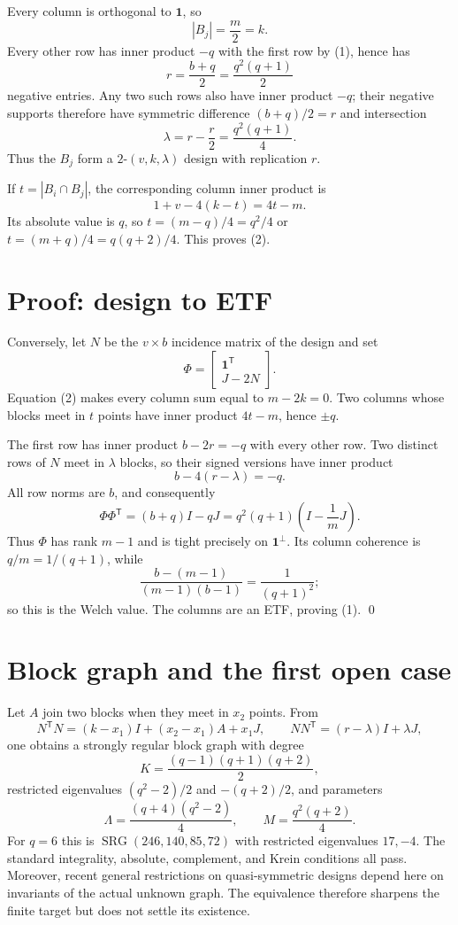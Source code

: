 \documentclass[10pt]{article}
\newcommand{\one}{\mathbf 1}
\begin{document}
Every column is orthogonal to $\one$, so
\[
 |B_j|=\frac m2=k.                                      \tag{2}
\]
Every other row has inner product $-q$ with the first row by (1), hence has
\[
 r=\frac{b+q}{2}=\frac{q^2(q+1)}2                       \tag{3}
\]
negative entries.  Any two such rows also have inner product $-q$; their
negative supports therefore have symmetric difference $(b+q)/2=r$ and
intersection
\[
 \lambda=r-\frac r2=\frac{q^2(q+1)}4.                  \tag{4}
\]
Thus the $B_j$ form a $2$-$(v,k,\lambda)$ design with replication $r$.

If $t=|B_i\cap B_j|$, the corresponding column inner product is
\[
 1+v-4(k-t)=4t-m.
\]
Its absolute value is $q$, so $t=(m-q)/4=q^2/4$ or
$t=(m+q)/4=q(q+2)/4$.  This proves (2).

\section*{Proof: design to ETF}

Conversely, let $N$ be the $v\times b$ incidence matrix of the design and set
\[
 \Phi=\begin{bmatrix}\one^{\mathsf T}\\ J-2N\end{bmatrix}.
\]
Equation (2) makes every column sum equal to $m-2k=0$.  Two columns whose
blocks meet in $t$ points have inner product $4t-m$, hence $\pm q$.

The first row has inner product $b-2r=-q$ with every other row.  Two distinct
rows of $N$ meet in $\lambda$ blocks, so their signed versions have inner
product
\[
 b-4(r-\lambda)=-q.
\]
All row norms are $b$, and consequently
\[
 \Phi\Phi^{\mathsf T}=(b+q)I-qJ
 =q^2(q+1)\left(I-\frac1mJ\right).                     \tag{5}
\]
Thus $\Phi$ has rank $m-1$ and is tight precisely on $\one^\perp$.
Its column coherence is $q/m=1/(q+1)$, while
\[
 \frac{b-(m-1)}{(m-1)(b-1)}=\frac1{(q+1)^2};
\]
so this is the Welch value.  The columns are an ETF, proving (1). \qed

\section*{Block graph and the first open case}

Let $A$ join two blocks when they meet in $x_2$ points.  From
\[
 N^{\mathsf T}N=(k-x_1)I+(x_2-x_1)A+x_1J,
 \qquad NN^{\mathsf T}=(r-\lambda)I+\lambda J,
\]
one obtains a strongly regular block graph with degree
\[
 K=\frac{(q-1)(q+1)(q+2)}2,
\]
restricted eigenvalues $(q^2-2)/2$ and $-(q+2)/2$, and parameters
\[
 \Lambda=\frac{(q+4)(q^2-2)}4,\qquad
 M=\frac{q^2(q+2)}4.
\]
For $q=6$ this is $\operatorname{SRG}(246,140,85,72)$ with restricted
eigenvalues $17,-4$.  The standard integrality, absolute, complement, and
Krein conditions all pass.  Moreover, recent general restrictions on
quasi-symmetric designs \cite{Bagchi} depend here on invariants of the actual
unknown graph.  The equivalence therefore sharpens the finite target but does
not settle its existence.
\end{document}
